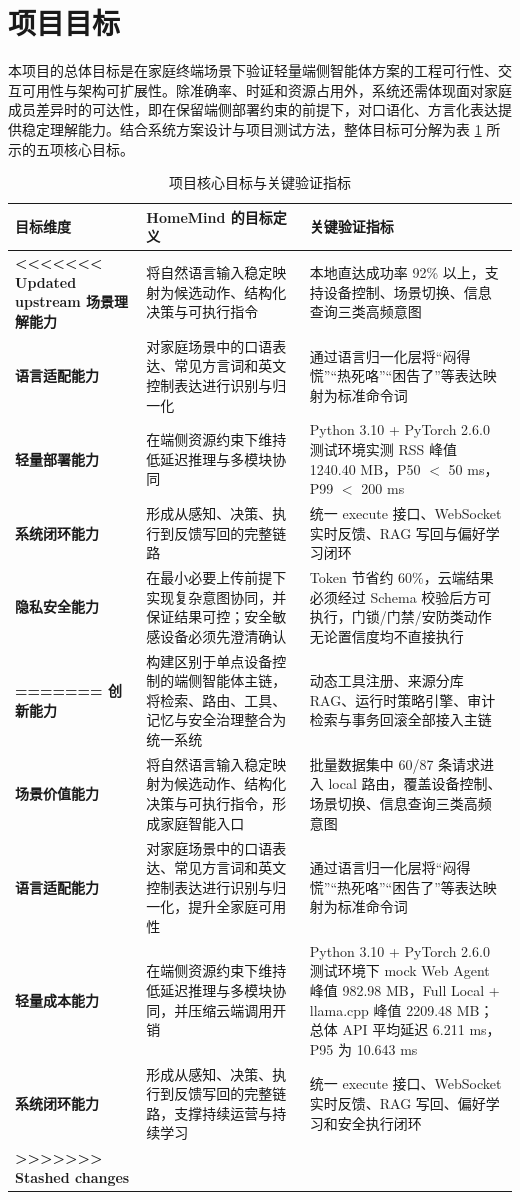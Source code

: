 \documentclass[12pt,a4paper,oneside]{ctexrep}
\begin{document}
\section{项目目标}

本项目的总体目标是在家庭终端场景下验证轻量端侧智能体方案的工程可行性、交互可用性与架构可扩展性。除准确率、时延和资源占用外，系统还需体现面对家庭成员差异时的可达性，即在保留端侧部署约束的前提下，对口语化、方言化表达提供稳定理解能力。结合系统方案设计与项目测试方法，整体目标可分解为表 \ref{tab:chapter1-goals} 所示的五项核心目标。

\begin{table}[H]
    \centering
    \caption{项目核心目标与关键验证指标}
    \label{tab:chapter1-goals}
    \begin{tabularx}{\textwidth}{>{\bfseries}p{2.6cm}X X}
        \toprule
        目标维度 & HomeMind 的目标定义 & 关键验证指标 \\
        \midrule
<<<<<<< Updated upstream
        场景理解能力 & 将自然语言输入稳定映射为候选动作、结构化决策与可执行指令 & 本地直达成功率 92\% 以上，支持设备控制、场景切换、信息查询三类高频意图 \\
        语言适配能力 & 对家庭场景中的口语表达、常见方言词和英文控制表达进行识别与归一化 & 通过语言归一化层将“闷得慌”“热死咯”“困告了”等表达映射为标准命令词 \\
        轻量部署能力 & 在端侧资源约束下维持低延迟推理与多模块协同 & Python 3.10 + PyTorch 2.6.0 测试环境实测 RSS 峰值 1240.40 MB，P50 $<$ 50 ms，P99 $<$ 200 ms \\
        系统闭环能力 & 形成从感知、决策、执行到反馈写回的完整链路 & 统一 execute 接口、WebSocket 实时反馈、RAG 写回与偏好学习闭环 \\
        隐私安全能力 & 在最小必要上传前提下实现复杂意图协同，并保证结果可控；安全敏感设备必须先澄清确认 & Token 节省约 60\%，云端结果必须经过 Schema 校验后方可执行，门锁/门禁/安防类动作无论置信度均不直接执行 \\
=======
        创新能力 & 构建区别于单点设备控制的端侧智能体主链，将检索、路由、工具、记忆与安全治理整合为统一系统 & 动态工具注册、来源分库 RAG、运行时策略引擎、审计检索与事务回滚全部接入主链 \\
        场景价值能力 & 将自然语言输入稳定映射为候选动作、结构化决策与可执行指令，形成家庭智能入口 & 批量数据集中 60/87 条请求进入 local 路由，覆盖设备控制、场景切换、信息查询三类高频意图 \\
        语言适配能力 & 对家庭场景中的口语表达、常见方言词和英文控制表达进行识别与归一化，提升全家庭可用性 & 通过语言归一化层将“闷得慌”“热死咯”“困告了”等表达映射为标准命令词 \\
        轻量成本能力 & 在端侧资源约束下维持低延迟推理与多模块协同，并压缩云端调用开销 & Python 3.10 + PyTorch 2.6.0 测试环境下 mock Web Agent 峰值 982.98 MB，Full Local + llama.cpp 峰值 2209.48 MB；总体 API 平均延迟 6.211 ms，P95 为 10.643 ms \\
        系统闭环能力 & 形成从感知、决策、执行到反馈写回的完整链路，支撑持续运营与持续学习 & 统一 execute 接口、WebSocket 实时反馈、RAG 写回、偏好学习和安全执行闭环 \\
>>>>>>> Stashed changes
        \bottomrule
    \end{tabularx}
\end{table}
\end{document}
